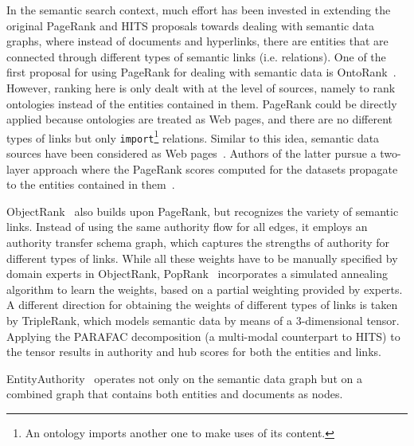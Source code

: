 In the semantic search context, much effort has been invested in extending the original PageRank and HITS proposals towards dealing with semantic data graphs, where instead of documents and hyperlinks, there are entities that are connected through different types of semantic links (i.e. relations). One of the first proposal for using PageRank for dealing with semantic data is OntoRank~\cite{DBLP:conf/semweb/DingPFJPK05}. However, ranking here is only dealt with at the level of sources, namely to rank ontologies instead of the entities contained in them. PageRank could be directly applied because ontologies are treated as Web pages, and there are no different types of links but only \verb+import+\footnote{An ontology imports another one to make uses of its content.} relations. Similar to this idea, semantic data sources have been considered as Web pages~\cite{DBLP:conf/esws/DelbruTCTD10,DBLP:conf/semweb/HarthKD09}. Authors of the latter pursue a two-layer approach where the PageRank scores computed for the datasets propagate to the entities contained in them~\cite{DBLP:conf/semweb/HarthKD09}. 

ObjectRank~\cite{DBLP:conf/vldb/BalminHP04} also builds upon PageRank, but recognizes the variety of semantic links. Instead of using the same authority flow for all edges, it employs an authority transfer schema graph, which captures the strengths of authority for different types of links. While all these weights have to be manually specified by domain experts in ObjectRank, PopRank~\cite{DBLP:conf/www/NieZWM05} incorporates a simulated annealing algorithm to learn the weights, based on a partial weighting provided by experts. A different direction for obtaining the weights of different types of links is taken by TripleRank, which models semantic data by means of a 3-dimensional tensor. Applying the PARAFAC decomposition (a multi-modal counterpart to HITS) to the tensor results in authority and hub scores for both the entities and links. 

EntityAuthority~\cite{DBLP:conf/webdb/StoyanovichBBW07} operates not only on the semantic data graph but on a combined graph that contains both entities and documents as nodes. 

